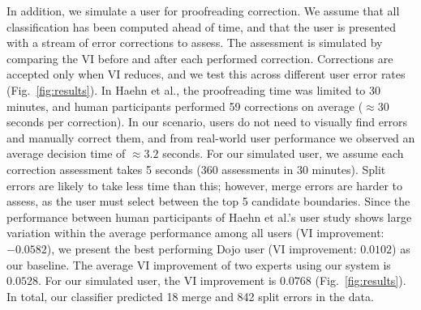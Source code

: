 In addition, we simulate a user for proofreading correction. We assume that all classification has been computed ahead of time, and that the user is presented with a stream of error corrections to assess. The assessment is simulated by comparing the VI before and after each performed correction. Corrections are accepted only when VI reduces, and we test this across different user error rates (Fig.~\ref{fig:results}). In Haehn et al., the proofreading time was limited to 30 minutes, and human participants performed 59 corrections on average ($\approx30$ seconds per correction). In our scenario, users do not need to visually find errors and manually correct them, and from real-world user performance we observed an average decision time of $\approx3.2$ seconds. For our simulated user, we assume each correction assessment takes 5 seconds (360 assessments in 30 minutes). Split errors are likely to take less time than this; however, merge errors are harder to assess, as the user must select between the top 5 candidate boundaries. Since the performance between human participants of Haehn et al.'s user study shows large variation within the average performance among all users (VI improvement: $-0.0582$), we present the best performing Dojo user (VI improvement: $0.0102$) as our baseline. The average VI improvement of two experts using our system is $0.0528$. For our simulated user, the VI improvement is $0.0768$ (Fig.~\ref{fig:results}). In total, our classifier predicted 18 merge and 842 split errors in the data.









